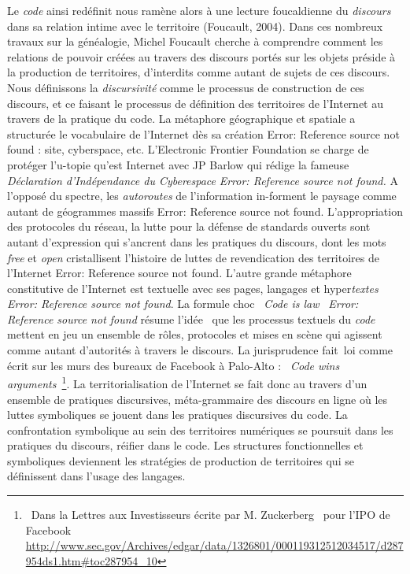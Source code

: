 {\color{black}
Le \textit{code} ainsi red\'efinit nous ram\`ene alors \`a une lecture foucaldienne du \textit{discours }dans sa
relation intime avec le territoire (Foucault, 2004). Dans ces nombreux travaux sur la g\'en\'ealogie, Michel Foucault
cherche \`a comprendre comment les relations de pouvoir cr\'e\'ees au travers des discours port\'es sur les objets
pr\'eside \`a la production de territoires, d'interdits comme autant de sujets de ces discours. Nous d\'efinissons la
\textit{discursivit\'e }comme le processus de construction de ces discours, et ce faisant le processus de d\'efinition
des territoires de l'Internet au travers de la pratique du code. La m\'etaphore g\'eographique et spatiale a structur\'ee le vocabulaire de l'Internet
d\`es sa cr\'eation Error: Reference source not found : site, cyberspace, etc. L'Electronic Frontier Foundation se
charge de prot\'eger l'u-topie qu'est Internet avec JP Barlow qui r\'edige la fameuse \textit{D\'eclaration
d'Ind\'ependance du Cyberespace }\textit{Error: Reference source not found}\textit{. }A l'oppos\'e du spectre, les
\textit{autoroutes} de l'information in-forment le paysage comme autant de g\'eogrammes massifs Error: Reference source
not found. L'appropriation des protocoles du r\'eseau, la lutte pour la d\'efense de standards ouverts\textit{ }sont
autant d'expression qui s'ancrent dans les pratiques du discours, dont les mots \textit{free }et \textit{open
}cristallisent l'histoire de luttes de revendication des territoires de l'Internet Error: Reference source not
found\textit{. }L'autre grande m\'etaphore constitutive de l'Internet est textuelle avec ses pages, langages et
hyper\textit{textes }\textit{Error: Reference source not found}. La formule choc \textit{{\guillemotleft}~Code is
law~{\guillemotright} }\textit{Error: Reference source not found} r\'esume l'id\'ee \ que les processus textuels du
\textit{code }mettent en jeu un ensemble de r\^oles, protocoles et mises en sc\`ene qui agissent comme autant
d'autorit\'es \`a travers le discours. La jurisprudence fait~loi comme \'ecrit sur les murs des bureaux de Facebook \`a
Palo-Alto : \textit{{\guillemotleft}~Code wins arguments~{\guillemotright}}\footnote{\ Dans la Lettres aux
Investisseurs \'ecrite par M. Zuckerberg \ pour l'IPO de Facebook
\url{http://www.sec.gov/Archives/edgar/data/1326801/000119312512034517/d287954ds1.htm\#toc287954_10}}. La
territorialisation de l'Internet se fait donc au travers d'un ensemble de pratiques discursives, m\'eta-grammaire des
discours en ligne o\`u les luttes symboliques se jouent dans les pratiques discursives du code. La confrontation
symbolique au sein des territoires num\'eriques se poursuit dans les pratiques du discours, r\'eifier dans le code. Les
structures fonctionnelles et symboliques deviennent les strat\'egies de production de territoires qui se d\'efinissent
dans l'usage des langages. }


